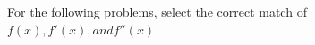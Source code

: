 \documentclass{ximera}
\begin{document}
\begin{question}
For the following problems, select the correct match of $f(x),f'(x), and f''(x)$
\begin{multipleChoice}
\end{multipleChoice}


\end{question}
\end{document}
